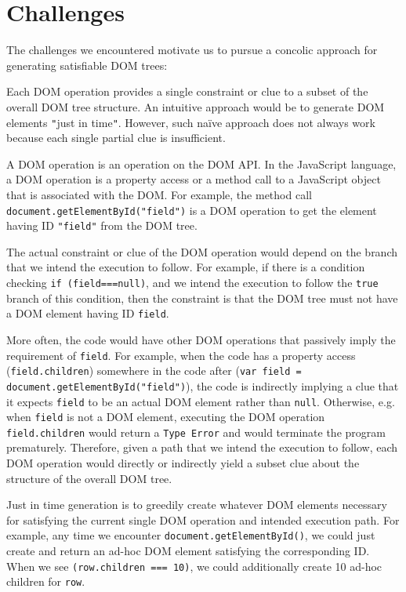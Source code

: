 \section{Challenges}
The challenges we encountered motivate us to pursue a concolic approach for generating satisfiable DOM trees:  

Each DOM operation provides a single constraint or clue to a subset of the overall DOM tree structure.  An intuitive approach would be to generate DOM elements {\tt "}just in time{\tt "}.  
However, such na\"ive approach does not always work because each single partial clue is insufficient.  

A DOM operation is an operation on the DOM API.  In the JavaScript language, a DOM operation is a property access or a method call to a JavaScript object that is associated with the DOM.  
For example, the method call {\tt document.getElementById("field")} is a DOM operation to get the element having ID {\tt "field"} from the DOM tree.  

The actual constraint or clue of the DOM operation would depend on the branch that we intend the execution to follow.  
For example, if there is a condition checking {\tt if (field===null)}, and we intend the execution to follow the {\tt true} branch of this condition,  
then the constraint is that the DOM tree must not have a DOM element having ID {\tt field}.  

More often, the code would have other DOM operations that passively imply the requirement of {\tt field}.  
For example, when the code has a property access ({\tt field.children}) somewhere in the code after ({\tt var field = document.getElementById("field")}), 
the code is indirectly implying a clue that it expects {\tt field} to be an actual DOM element rather than {\tt null}.  
Otherwise, e.g. when {\tt field} is not a DOM element, executing the DOM operation {\tt field.children} would return a {\tt Type Error} and would terminate the program prematurely.    
Therefore, given a path that we intend the execution to follow, each DOM operation would directly or indirectly yield a subset clue about the structure of the overall DOM tree.  

Just in time generation is to greedily create whatever DOM elements necessary for satisfying the current single DOM operation and intended execution path.    
For example, any time we encounter {\tt document.getElementById()}, we could just create and return an ad-hoc DOM element satisfying the corresponding ID.  
When we see {\tt (row.children === 10)}, we could additionally create 10 ad-hoc children for {\tt row}.  

